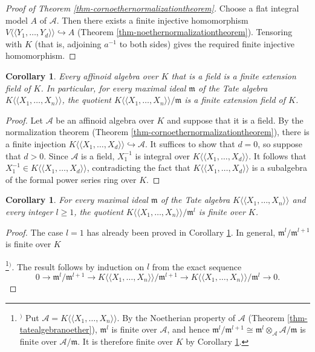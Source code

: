 \documentclass[a4paper,12pt, dvipdfmx]{jsbook}
\def\dl{\langle\!\langle}
\def\dr{\rangle\!\rangle}
\theoremstyle{plain}
\newtheorem{cor}[thm]{\bfseries Corollary}
\theoremstyle{definition}
\newcounter{chushaku}
\def\chu#1{\addtocounter{chushaku}{1}\footnote[\value{chushaku}]{${}^)$ #1}${}^)$}
\begin{document}
\begin{proof}[{\rm Proof of Theorem \ref{thm-cornoethernormalizationtheorem}}]
Choose a flat integral model $A$ of $\mathcal{A}$. Then there exists a finite injective homomorphism $V\dl Y_1,\ldots,Y_d\dr\hookrightarrow A$ (Theorem \ref{thm-noethernormalizationtheorem}).
Tensoring with $K$ (that is, adjoining $a^{-1}$ to both sides) gives the required finite injective homomorphism.
\end{proof}

\begin{cor}\label{cor-noethernormalizationtheorem1}{\rm 
Every affinoid algebra over $K$ that is a field is a finite extension field of $K$.
In particular, for every maximal ideal $\mathfrak{m}$ of the Tate algebra $K\dl X_1,\ldots,X_n\dr$, the quotient $K\dl X_1,\ldots,X_n\dr/\mathfrak{m}$ is a finite extension field of $K$.}
\end{cor}

\begin{proof}[Proof]
Let $\mathcal{A}$ be an affinoid algebra over $K$ and suppose that it is a field.
By the normalization theorem (Theorem \ref{thm-cornoethernormalizationtheorem}), there is a finite injection $K\dl X_1,\ldots,X_d\dr\hookrightarrow\mathcal{A}$.
It suffices to show that $d=0$, so suppose that $d>0$.
Since $\mathcal{A}$ is a field, $X^{-1}_1$ is integral over $K\dl X_1,\ldots,X_d\dr$.
It follows that $X^{-1}_1\in K\dl X_1,\ldots,X_d\dr$, contradicting the fact that $K\dl X_1,\ldots,X_d\dr$ is a subalgebra of the formal power series ring over $K$.
\end{proof}

\begin{cor}\label{cor-noethernormalizationtheorem2}{\rm 
For every maximal ideal $\mathfrak{m}$ of the Tate algebra $K\dl X_1,\ldots,X_n\dr$ and every integer $l\geq 1$, the quotient $K\dl X_1,\ldots,X_n\dr/\mathfrak{m}^l$ is finite over $K$.}
\end{cor}

\begin{proof}[Proof]
The case $l=1$ has already been proved in Corollary \ref{cor-noethernormalizationtheorem1}.
In general, $\mathfrak{m}^l/\mathfrak{m}^{l+1}$ is finite over $K$\chu{Put $\mathcal{A}=K\dl X_1,\ldots,X_n\dr$. By the Noetherian property of $\mathcal{A}$ (Theorem \ref{thm-tatealgebranoether}), $\mathfrak{m}^l$ is finite over $\mathcal{A}$, and hence $\mathfrak{m}^l/\mathfrak{m}^{l+1}\cong\mathfrak{m}^l\otimes_{\mathcal{A}}\mathcal{A}/\mathfrak{m}$ is finite over $\mathcal{A}/\mathfrak{m}$. It is therefore finite over $K$ by Corollary \ref{cor-noethernormalizationtheorem1}.}. The result follows by induction on $l$ from the exact sequence
$$
0\longrightarrow\mathfrak{m}^l/\mathfrak{m}^{l+1}\longrightarrow K\dl X_1,\ldots,X_n\dr/\mathfrak{m}^{l+1}\longrightarrow K\dl X_1,\ldots,X_n\dr/\mathfrak{m}^l\longrightarrow 0.
$$
\end{proof}
\end{document}
